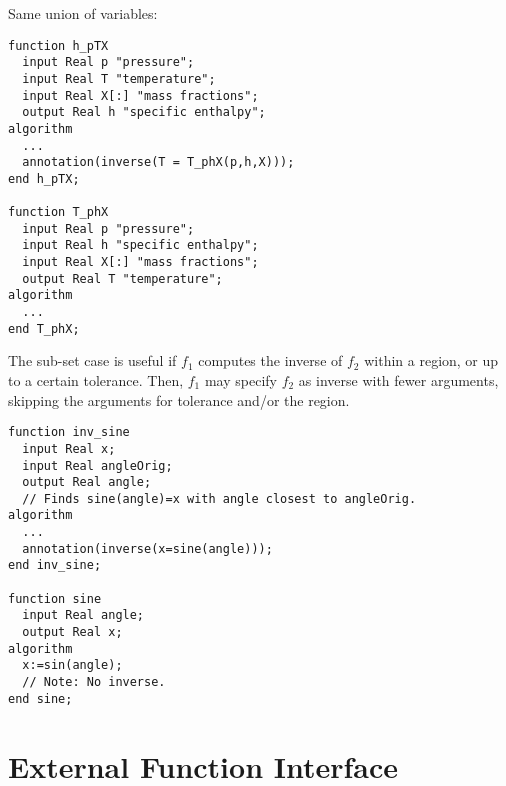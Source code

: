 \begin{example}
Same union of variables:
\begin{lstlisting}[language=modelica]
function h_pTX
  input Real p "pressure";
  input Real T "temperature";
  input Real X[:] "mass fractions";
  output Real h "specific enthalpy";
algorithm
  ...
  annotation(inverse(T = T_phX(p,h,X)));
end h_pTX;

function T_phX
  input Real p "pressure";
  input Real h "specific enthalpy";
  input Real X[:] "mass fractions";
  output Real T "temperature";
algorithm
  ...
end T_phX;
\end{lstlisting}
\end{example}

The sub-set case is useful if $f_1$ computes the inverse of $f_2$ within a region, or up to a certain tolerance.
Then, $f_1$ may specify $f_2$ as inverse with fewer arguments, skipping the arguments for tolerance and/or the region.

\begin{example}

\begin{lstlisting}[language=modelica]
function inv_sine
  input Real x;
  input Real angleOrig;
  output Real angle;
  // Finds sine(angle)=x with angle closest to angleOrig.
algorithm
  ...
  annotation(inverse(x=sine(angle)));
end inv_sine;

function sine
  input Real angle;
  output Real x;
algorithm
  x:=sin(angle);
  // Note: No inverse.
end sine;
\end{lstlisting}
\end{example}
\section{External Function Interface}\label{external-function-interface}

